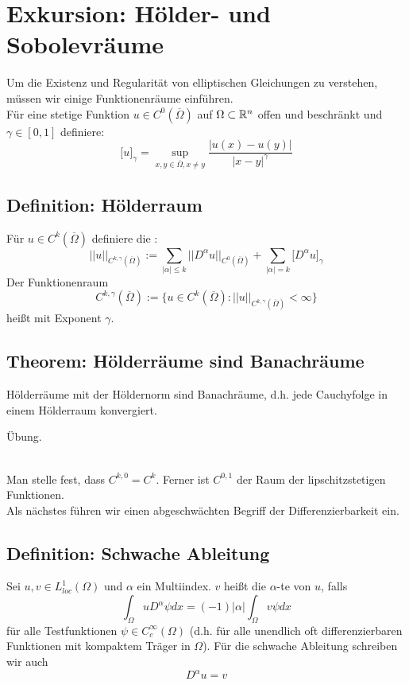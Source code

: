 \section{Exkursion: Hölder- und Sobolevräume}
\label{sec:para8}
	Um die Existenz und Regularität von elliptischen Gleichungen zu verstehen, müssen wir einige Funktionenräume einführen. \\
	Für eine stetige Funktion $u \in C^0(\overline{\Omega})$ auf $\Omega \subset \mathbb{R}^n$ offen und beschränkt und $\gamma \in [0,1]$ definiere:
	\[ \lbrack u \rbrack_\gamma = \sup_{x,y \in \overline{\Omega}, x \neq y} \frac{|u(x)-u(y)|}{|x-y|^\gamma} \]
	
\subsection{Definition: Hölderraum}
\label{def_51} \label{hoelderraum}
	Für $u \in C^k(\overline{\Omega})$ definiere die : \marginnote{[51]}
	\[ ||u||_{C^{k,\gamma}(\overline{\Omega})} := \sum_{|\alpha| \leq k} ||D^\alpha u||_{C^0(\overline{\Omega})} + \sum_{|\alpha| = k} \lbrack D^\alpha u \rbrack_\gamma \]
	Der Funktionenraum
	\[ C^{k,\gamma}(\overline{\Omega}) := \{ u \in C^k(\overline{\Omega}) : ||u||_{C^{k,\gamma}(\overline{\Omega})} < \infty \} \]
	heißt  mit Exponent $\gamma$.
	
	
\subsection{Theorem: Hölderräume sind Banachräume}
\label{thm_52}
	Hölderräume mit der Höldernorm sind Banachräume, d.h. jede Cauchyfolge in einem Hölderraum konvergiert. \marginnote{[52]}
	
	Übung.
	
\mbox{} \\
Man stelle fest, dass $C^{k,0} = C^k$. Ferner ist $C^{0,1}$ der Raum der lipschitzstetigen Funktionen. \\
Als nächstes führen wir einen abgeschwächten Begriff der Differenzierbarkeit ein.

\subsection{Definition: Schwache Ableitung}
\label{def:schwache_abl} \label{def_53}
	Sei $u, v \in L^1_{loc}(\Omega)$ und $\alpha$ ein Multiindex. $v$ heißt die $\alpha$-te  von $u$, falls \marginnote{[53]}
	\begin{equation}
		\int_{\Omega} uD^\alpha \psi dx = (-1) |\alpha| \int_{\Omega} v \psi dx \label{eq_28}
	\end{equation}
	für alle Testfunktionen $\psi \in C_c^\infty(\Omega)$ (d.h. für alle unendlich oft differenzierbaren Funktionen mit kompaktem Träger in $\Omega$). Für die schwache Ableitung schreiben wir auch
	\[ D^\alpha u = v \]
	
